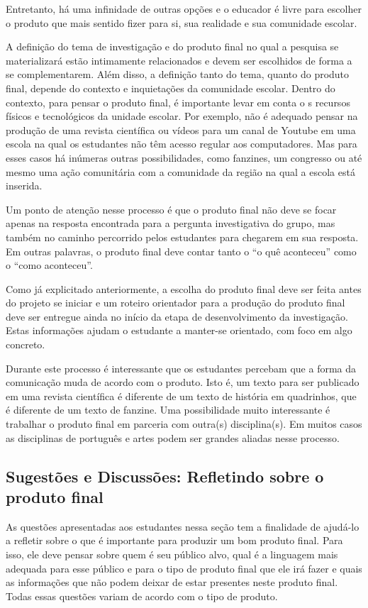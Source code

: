 \begin{paginatexto}
Entretanto, há uma infinidade de outras opções e o educador é livre para escolher o produto que mais sentido fizer para si, sua realidade e sua comunidade escolar. 

A definição do tema de investigação e do produto final no qual a pesquisa se materializará estão intimamente relacionados e devem ser escolhidos de forma a se complementarem. Além disso, a definição tanto do tema, quanto do produto final, depende do contexto e inquietações da comunidade escolar. Dentro do contexto, para pensar o produto final, é importante levar em conta o s recursos físicos e tecnológicos da unidade escolar. Por exemplo, não é adequado pensar na produção de uma revista científica ou vídeos para um canal de Youtube em uma escola na qual os estudantes não têm acesso regular aos computadores. Mas para esses casos há inúmeras outras possibilidades, como fanzines, um congresso ou até mesmo uma ação comunitária com a comunidade da região na qual a escola está inserida. 

Um ponto de atenção nesse processo é que o produto final não deve se focar apenas na resposta encontrada para a pergunta investigativa do grupo, mas também no caminho percorrido pelos estudantes para chegarem em sua resposta. Em outras palavras, o produto final deve contar tanto o “o quê aconteceu” como o “como aconteceu”.

Como já explicitado anteriormente, a escolha do produto final deve ser feita antes do projeto se iniciar e um roteiro orientador para a produção do produto final deve ser entregue ainda no início da etapa de desenvolvimento da investigação. Estas informações ajudam o estudante a manter-se orientado, com foco em algo concreto. 

Durante este processo é interessante que os estudantes percebam que a forma da comunicação muda de acordo com o produto. Isto é, um texto para ser publicado em uma revista científica é diferente de um texto de história em quadrinhos, que é diferente de um texto de fanzine. Uma possibilidade muito interessante é trabalhar o produto final em parceria com outra(s) disciplina(s). Em muitos casos as disciplinas de português e artes podem ser grandes aliadas nesse processo. 

\subsection{Sugestões e Discussões: Refletindo sobre o produto final}

As questões apresentadas aos estudantes nessa seção tem a finalidade de ajudá-lo a refletir sobre o que é importante para produzir um bom produto final. Para isso, ele deve pensar sobre quem é seu público alvo, qual é a linguagem mais adequada para esse público e para o tipo de produto final que ele irá fazer e quais as informações que não podem deixar de estar presentes neste produto final. Todas essas questões variam de acordo com o tipo de produto.


\end{paginatexto}
